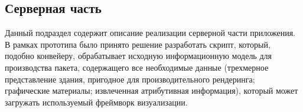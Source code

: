 ﻿\subsection{Серверная часть}
\label{subsections:ServerImpl}

Данный подраздел содержит описание реализации серверной части приложения.
В рамках прототипа было принято решение разработать скрипт,
который, подобно конвейеру, обрабатывает исходную информационную модель
для производства пакета, содержащего все необходимые данные
(трехмерное представление здания, пригодное для производительного рендеринга;
графические материалы; извлеченная атрибутивная информация),
который может загружать используемый фреймворк визуализации.




